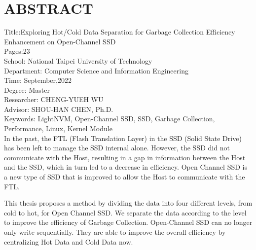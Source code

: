 \chapter*{ABSTRACT}


\noindent
Title:Exploring Hot/Cold Data Separation for Garbage Collection Efficiency Enhancement on Open-Channel SSD\\
Pages:23\\
School: National Taipei University of Technology\\
Department: Computer Science and Information Engineering\\
Time: September,2022\\
Degree: Master\\
Researcher: CHENG-YUEH WU\\
Advisor: SHOU-HAN CHEN, Ph.D.\\
Keywords: LightNVM, Open-Channel SSD, SSD, Garbage Collection, Performance, Linux, Kernel Module\\
\indent
In the past, the FTL (Flash Translation Layer) in the SSD (Solid State Drive) has been left to manage the SSD internal alone. However, the SSD did not communicate with the Host, resulting in a gap in information between the Host and the SSD, which in turn led to a decrease in efficiency. Open Channel SSD is a new type of SSD that is improved to allow the Host to communicate with the FTL.

\indent
This thesis proposes a method by dividing the data into four different levels, from cold to hot, for Open Channel SSD. We separate the data according to the level to improve the efficiency of Garbage Collection. Open-Channel SSD can no longer only write sequentially. They are able to improve the overall efficiency by centralizing Hot Data and Cold Data now.


